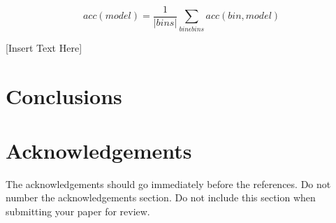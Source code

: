 \documentclass[11pt]{article}
\begin{document}
\begin{equation}
acc(model) = \frac{1}{|bins|} \sum_{bin  \epsilon  bins} acc(bin, model)
\end{equation}


[Insert Text Here]

\section{Conclusions}
\label{conclusions}

\section*{Acknowledgements}

The acknowledgements should go immediately before the references.  Do
not number the acknowledgements section. Do not include this section
when submitting your paper for review.




\end{document}
